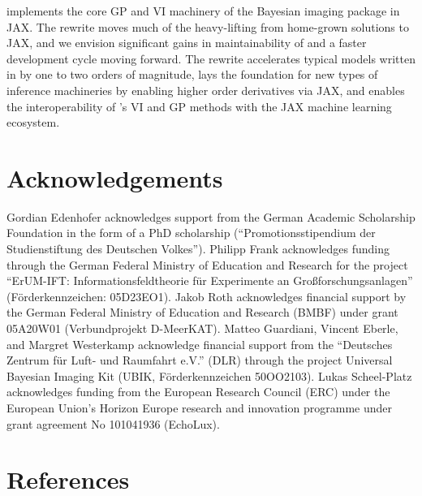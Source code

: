 \documentclass[10pt,a4paper,onecolumn]{article}
\let\textttOrig=\texttt
\def\texttt#1{\expandafter\textttOrig{\seqsplit{#1}}}
\begin{document}
\texttt{NIFTy.re} implements the core GP and VI machinery of the
Bayesian imaging package \texttt{NIFTy} in JAX. The rewrite moves much
of the heavy-lifting from home-grown solutions to JAX, and we envision
significant gains in maintainability of \texttt{NIFTy.re} and a faster
development cycle moving forward. The rewrite accelerates typical models
written in \texttt{NIFTy} by one to two orders of magnitude, lays the
foundation for new types of inference machineries by enabling higher
order derivatives via JAX, and enables the interoperability of
\texttt{NIFTy}'s VI and GP methods with the JAX machine learning
ecosystem.

\hypertarget{acknowledgements}{%
\section{Acknowledgements}\label{acknowledgements}}

Gordian Edenhofer acknowledges support from the German Academic
Scholarship Foundation in the form of a PhD scholarship
(``Promotionsstipendium der Studienstiftung des Deutschen Volkes'').
Philipp Frank acknowledges funding through the German Federal Ministry
of Education and Research for the project ``ErUM-IFT:
Informationsfeldtheorie für Experimente an Großforschungsanlagen''
(Förderkennzeichen: 05D23EO1). Jakob Roth acknowledges financial support
by the German Federal Ministry of Education and Research (BMBF) under
grant 05A20W01 (Verbundprojekt D-MeerKAT). Matteo Guardiani, Vincent
Eberle, and Margret Westerkamp acknowledge financial support from the
``Deutsches Zentrum für Luft- und Raumfahrt e.V.'' (DLR) through the
project Universal Bayesian Imaging Kit (UBIK, Förderkennzeichen
50OO2103). Lukas Scheel-Platz acknowledges funding from the European
Research Council (ERC) under the European Union's Horizon Europe
research and innovation programme under grant agreement No 101041936
(EchoLux).

\hypertarget{references}{%
\section{References}\label{references}}
\end{document}
